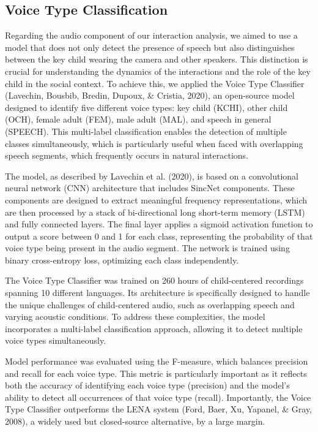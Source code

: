 \documentclass[
  man,floatsintext]{apa6}
\begin{document}
\subsection{Voice Type Classification}\label{voice-type-classification}

Regarding the audio component of our interaction analysis, we aimed to use a model that does not only detect the presence of speech but also distinguishes between the key child wearing the camera and other speakers. This distinction is crucial for understanding the dynamics of the interactions and the role of the key child in the social context. To achieve this, we applied the Voice Type Classifier (Lavechin, Bousbib, Bredin, Dupoux, \& Cristia, 2020), an open-source model designed to identify five different voice types: key child (KCHI), other child (OCH), female adult (FEM), male adult (MAL), and speech in general (SPEECH). This multi-label classification enables the detection of multiple classes simultaneously, which is particularly useful when faced with overlapping speech segments, which frequently occurs in natural interactions.

The model, as described by Lavechin et al. (2020), is based on a convolutional neural network (CNN) architecture that includes SincNet components. These components are designed to extract meaningful frequency representations, which are then processed by a stack of bi-directional long short-term memory (LSTM) and fully connected layers. The final layer applies a sigmoid activation function to output a score between 0 and 1 for each class, representing the probability of that voice type being present in the audio segment. The network is trained using binary cross-entropy loss, optimizing each class independently.

The Voice Type Classifier was trained on 260 hours of child-centered recordings spanning 10 different languages. Its architecture is specifically designed to handle the unique challenges of child-centered audio, such as overlapping speech and varying acoustic conditions. To address these complexities, the model incorporates a multi-label classification approach, allowing it to detect multiple voice types simultaneously.

Model performance was evaluated using the F-measure, which balances precision and recall for each voice type. This metric is particularly important as it reflects both the accuracy of identifying each voice type (precision) and the model's ability to detect all occurrences of that voice type (recall). Importantly, the Voice Type Classifier outperforms the LENA system (Ford, Baer, Xu, Yapanel, \& Gray, 2008), a widely used but closed-source alternative, by a large margin.
\end{document}
